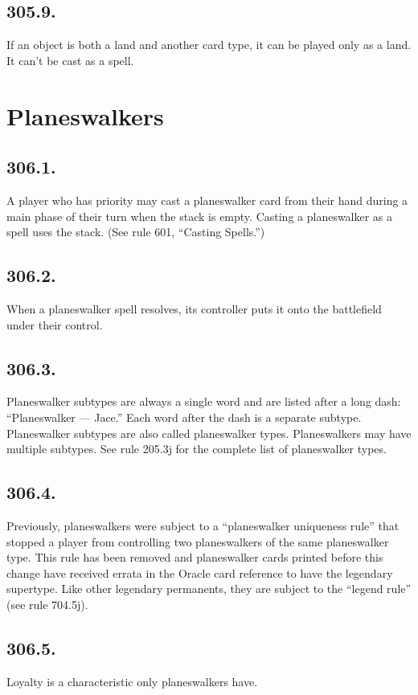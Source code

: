 \subsection*{305.9.}
If an object is both a land and another card type, it can be played only as a land. It can’t be cast as a spell.

\section{Planeswalkers}
\subsection*{306.1.}
A player who has priority may cast a planeswalker card from their hand during a main phase of their turn when the stack is empty. Casting a planeswalker as a spell uses the stack. (See rule 601, “Casting Spells.”)

\subsection*{306.2.}
When a planeswalker spell resolves, its controller puts it onto the battlefield under their control.

\subsection*{306.3.}
Planeswalker subtypes are always a single word and are listed after a long dash: “Planeswalker — Jace.” Each word after the dash is a separate subtype. Planeswalker subtypes are also called planeswalker types. Planeswalkers may have multiple subtypes. See rule 205.3j for the complete list of planeswalker types.

\subsection*{306.4.}
Previously, planeswalkers were subject to a “planeswalker uniqueness rule” that stopped a player from controlling two planeswalkers of the same planeswalker type. This rule has been removed and planeswalker cards printed before this change have received errata in the Oracle card reference to have the legendary supertype. Like other legendary permanents, they are subject to the “legend rule” (see rule 704.5j).

\subsection*{306.5.}
Loyalty is a characteristic only planeswalkers have.

